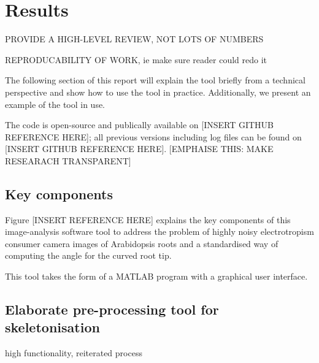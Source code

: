 
\chapter{Results} %

\label{results} %

%


PROVIDE A HIGH-LEVEL REVIEW, NOT LOTS OF NUMBERS

REPRODUCABILITY OF WORK, ie make sure reader could redo it


The following section of this report will explain the tool briefly from a technical perspective and show how to use the tool in practice. Additionally, we present an example of the tool in use.

The code is open-source and publically available on [INSERT GITHUB REFERENCE HERE]; all previous versions including log files can be found on [INSERT GITHUB REFERENCE HERE].
[EMPHAISE THIS: MAKE RESEARACH TRANSPARENT]

\section{Key components}

Figure [INSERT REFERENCE HERE] explains the key components of this image-analysis software tool to address the problem of highly noisy electrotropism consumer camera images of Arabidopsis roots and a standardised way of computing the angle for the curved root tip. 

This tool takes the form of a MATLAB program with a graphical user interface.

\section{Elaborate pre-processing tool for skeletonisation}
high functionality, reiterated process

